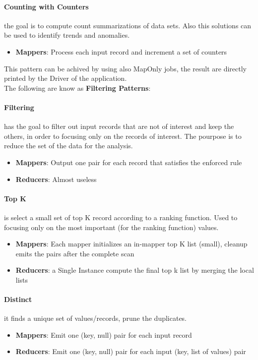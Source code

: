 \documentclass[12pt]{article}
\begin{document}
\paragraph{Counting with Counters} the goal is to compute count summarizations of data sets. Also this solutions can be used to identify trends and anomalies.
\begin{itemize}
  \item \textbf{Mappers}: Process each input record and increment a set of counters
\end{itemize}
This pattern can be achived by using also MapOnly jobs, the result are directly printed by the Driver of the application.\\

The following are know as \textbf{Filtering Patterns}:
\paragraph{Filtering} has the goal to filter out input records that are not of interest and keep the others, in order to focusing only on the records of interest. The pourpose is to reduce the set of the data for the analysis.
\begin{itemize}
  \item \textbf{Mappers}: Output one pair for each record that satisfies the enforced rule
  \item \textbf{Reducers}: Almost useless
\end{itemize}

\paragraph{Top K} is select a small set of top K record according to a ranking function. Used to focusing only on the most important (for the ranking function) values.
\begin{itemize}
  \item \textbf{Mappers}: Each mapper initializes an in-mapper top K list (small), cleanup emits the pairs after the complete scan
  \item \textbf{Reducers}: a Single Instance compute the final top k list by merging the local lists
\end{itemize}

\paragraph{Distinct} it finds a unique set of values/records, prune the duplicates.
\begin{itemize}
  \item \textbf{Mappers}: Emit one (key, null) pair for each input record
  \item \textbf{Reducers}: Emit one (key, null) pair for each input (key, list of values) pair
\end{itemize}
\end{document}
